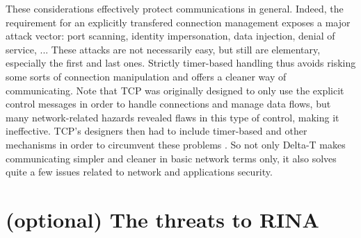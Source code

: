 \documentclass[a4paper]{proc}
\begin{document}
\par These considerations effectively protect communications in general. Indeed,
the requirement for an explicitly transfered connection management exposes a
major attack vector: port scanning, identity impersonation, data injection,
denial of service, ... These attacks are not necessarily easy, but still are
elementary, especially the first and last ones. Strictly timer-based handling
thus avoids risking some sorts of connection manipulation and offers a cleaner
way of communicating. Note that TCP was originally designed to only use the
explicit control messages in order to handle connections and manage data flows,
but many network-related hazards revealed flaws in this type of control, making
it ineffective. TCP's designers then had to include timer-based and other
mechanisms in order to circumvent these problems \cite{delta-t}. So not only
Delta-T makes communicating simpler and cleaner in basic network terms only, it
also solves quite a few issues related to network and applications security.


\part{(optional) The threats to RINA}


\nocite{*}
\newpage


\end{document}
